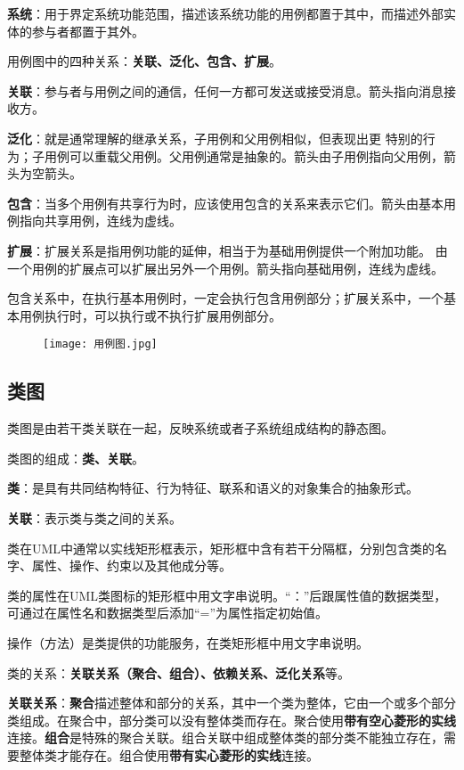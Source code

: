 \documentclass[cn, blue, normal, 12pt]{elegantnote}
\begin{document}
\textbf{系统}：用于界定系统功能范围，描述该系统功能的用例都置于其中，而描述外部实体的参与者都置于其外。

用例图中的四种关系：\textbf{关联、泛化、包含、扩展}。

\textbf{关联}：参与者与用例之间的通信，任何一方都可发送或接受消息。箭头指向消息接收方。

\textbf{泛化}：就是通常理解的继承关系，子用例和父用例相似，但表现出更
特别的行为；子用例可以重载父用例。父用例通常是抽象的。箭头由子用例指向父用例，箭头为空箭头。

\textbf{包含}：当多个用例有共享行为时，应该使用包含的关系来表示它们。箭头由基本用例指向共享用例，连线为虚线。

\textbf{扩展}：扩展关系是指用例功能的延伸，相当于为基础用例提供一个附加功能。 由一个用例的扩展点可以扩展出另外一个用例。箭头指向基础用例，连线为虚线。

包含关系中，在执行基本用例时，一定会执行包含用例部分；扩展关系中，一个基本用例执行时，可以执行或不执行扩展用例部分。

\begin{figure}[htbp]
    \centering
    \texttt{[image: 用例图.jpg]}
\end{figure}

\subsection{类图}

类图是由若干类关联在一起，反映系统或者子系统组成结构的静态图。

类图的组成：\textbf{类、关联}。

\textbf{类}：是具有共同结构特征、行为特征、联系和语义的对象集合的抽象形式。

\textbf{关联}：表示类与类之间的关系。

类在UML中通常以实线矩形框表示，矩形框中含有若干分隔框，分别包含类的名字、属性、操作、约束以及其他成分等。

类的属性在UML类图标的矩形框中用文字串说明。“：”后跟属性值的数据类型，可通过在属性名和数据类型后添加“=”为属性指定初始值。

操作（方法）是类提供的功能服务，在类矩形框中用文字串说明。

类的关系：\textbf{关联关系（聚合、组合）、依赖关系、泛化关系}等。

\textbf{关联关系}：\textbf{聚合}描述整体和部分的关系，其中一个类为整体，它由一个或多个部分类组成。在聚合中，部分类可以没有整体类而存在。聚合使用\textbf{带有空心菱形的实线}连接。\textbf{组合}是特殊的聚合关联。组合关联中组成整体类的部分类不能独立存在，需要整体类才能存在。组合使用\textbf{带有实心菱形的实线}连接。
\end{document}
